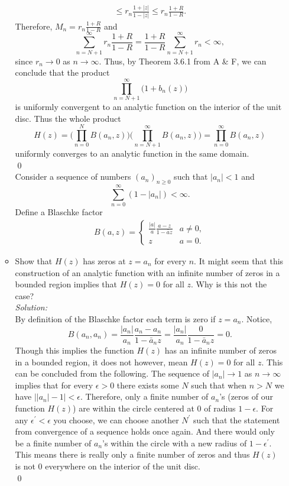 \documentclass[10pt]{amsart}
\theoremstyle{nonumberplain}
\begin{document}
\begin{enumerate}[label={\bf {\arabic*}:}]
\begin{itemize}
\begin{align*}
	\leq r_n \frac{1 + |z|}{1 - |z|} 
	\leq r_n \frac{1 + R}{1 - R}.
\end{align*}
Therefore, $M_n = r_n \frac{1 + R}{1 - R}$ and
$$
\sum_{n = N + 1}^ \infty r_n \frac{1 + R}{1 - R} = \frac{1 + R}{1 - R} \sum_{n = N + 1}^ \infty r_n < \infty,
$$
since $r_n \rightarrow 0$ as $n\rightarrow\infty$.
Thus, by Theorem 3.6.1 from A \& F, we can conclude that the product
$$ \prod_{n=N + 1}^\infty \big(1 + b_n(z)\big)$$
is uniformly convergent to an analytic function on the interior of the unit disc.
Thus the whole product 
$$H(z) = \Bigg(\prod_{n=0}^N B(a_n,z) \Bigg) \Bigg(\prod_{n = N + 1}^\infty B(a_n,z) \Bigg) = \prod_{n=0}^\infty B(a_n,z)$$
uniformly converges to an analytic function in the same domain. \\
\qed \\

Consider a sequence of numbers $(a_n)_{n \geq 0}$ such that $|a_n| < 1$ and
$$ \sum_{n = 0}^\infty (1 - |a_n|) < \infty. $$
Define a Blaschke factor
\begin{align*}
B(a,z) =
	\begin{cases}
		\frac{|a|}{a} \frac{ a - z}{ 1 - \bar a z} & a \neq 0,\\
  		z & a  = 0.
  	\end{cases}
\end{align*}
  
\item Show that $H(z)$ has zeros at $z = a_n$ for every $n$.  It
  might seem that this construction of an analytic function with an
  infinite number of zeros in a bounded region implies that $H(z) =
  0$ for all $z$.  Why is this not the case? \\

\noindent
\textit{Solution:} \\
By definition of the Blaschke factor each term is zero if $z = a_n$.
Notice,
$$
B(a_n, a_n)
	= \frac{|a_n|}{a_n} \frac{ a_n - a_n}{ 1 - \bar a_n z}
	= \frac{|a_n|}{a_n} \frac{ 0}{ 1 - \bar a_n z} = 0.
$$
Though this implies the function $H(z)$ has an infinite number of zeros in a bounded region, it does not however,  mean $H(z) = 0$ for all $z$.
This can be concluded from the following.
The sequence of $|a_n| \rightarrow 1$ as $n \rightarrow \infty$ implies that for every $\epsilon > 0$ there exists some $N$ such that when $n > N$ we have $\big| |a_n| - 1\big| < \epsilon$.
Therefore, only a finite number of $a_n$'s (zeros of our function $H(z)$) are within the circle centered at 0 of radius $1 - \epsilon$.
For any $\epsilon^\prime < \epsilon$ you choose, we can choose another $N^\prime$ such that the statement from convergence of a sequence holds once again.
And there would only be a finite number of $a_n$'s within the circle with a new radius of $1-\epsilon^\prime$.
This means there is really only a finite number of zeros and thus $H(z)$ is not 0 everywhere on the interior of the unit disc. \\
\qed
\end{itemize}
\newpage


\end{enumerate}
\end{document}
